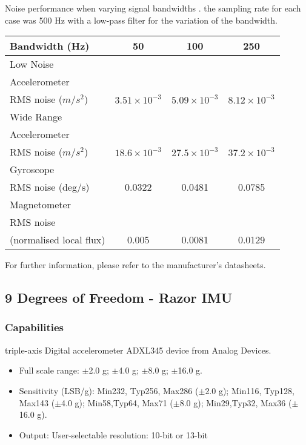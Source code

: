 Noise performance when varying signal bandwidths .
the sampling rate for each case was 500 Hz with a low-pass
filter for the variation of the bandwidth.


\begin{center}
\begin{tabular}{ |l|c|c|c| }
\hline
Bandwidth (Hz) & 50 & 100 & 250 \\
\hline
Low Noise \\ Accelerometer \\ RMS noise ($m/s^2$) & $3.51 \times 10^{-3}$ & $5.09 \times 10^{-3}$ & $8.12 \times 10^{-3}$\\
Wide Range \\ Accelerometer \\ RMS noise ($m/s^2$) & $18.6 \times 10^{-3}$ & $27.5 \times 10^{-3}$ & $37.2 \times 10^{-3}$\\
Gyroscope \\ RMS noise (deg/s) & 0.0322 & 0.0481 & 0.0785 \\
Magnetometer \\ RMS noise \\ (normalised local flux) & 0.005 & 0.0081 & 0.0129 \\
\hline
\end{tabular}
\end{center}


For further information, please refer to the manufacturer's datasheets.



\subsection*{9 Degrees of Freedom - Razor IMU}
\subsubsection*{Capabilities}

 triple-axis Digital accelerometer ADXL345 device from Analog Devices.

\begin{itemize}
   \item Full scale range: $\pm$2.0 g; $\pm$4.0 g; $\pm$8.0 g; $\pm$16.0 g.
   \item Sensitivity (LSB/g):
 Min232, Typ256, Max286 ($\pm$2.0 g);
 Min116, Typ128, Max143 ($\pm$4.0 g);
 Min58,Typ64, Max71 ($\pm$8.0 g);
 Min29,Typ32, Max36 ($\pm$16.0 g).
 \item Output: User-selectable resolution: 10-bit or 13-bit
 \end{itemize}

